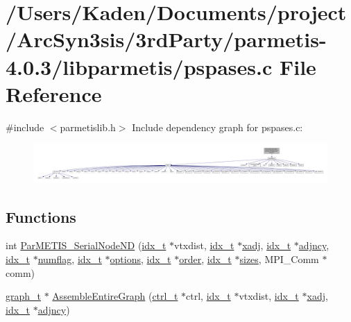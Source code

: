 \hypertarget{a00389}{}\section{/\+Users/\+Kaden/\+Documents/project/\+Arc\+Syn3sis/3rd\+Party/parmetis-\/4.0.3/libparmetis/pspases.c File Reference}
\label{a00389}
{\ttfamily \#include $<$parmetislib.\+h$>$}\newline
Include dependency graph for pspases.\+c\+:\nopagebreak
\begin{figure}[H]
\begin{center}
\leavevmode
\includegraphics[width=350pt]{a00390}
\end{center}
\end{figure}
\subsection*{Functions}
\begin{DoxyCompactItemize}
\item 
int \hyperlink{a00389_a5ea6a6f60f172d69aae0c4bace99a5ae}{Par\+M\+E\+T\+I\+S\+\_\+\+Serial\+Node\+ND} (\hyperlink{a00876_aaa5262be3e700770163401acb0150f52}{idx\+\_\+t} $\ast$vtxdist, \hyperlink{a00876_aaa5262be3e700770163401acb0150f52}{idx\+\_\+t} $\ast$\hyperlink{a00879_aa8fc7f75458e38e1e2979ed6db639164}{xadj}, \hyperlink{a00876_aaa5262be3e700770163401acb0150f52}{idx\+\_\+t} $\ast$\hyperlink{a00879_a20c068e3ebdd8f9889fb82c1f677d679}{adjncy}, \hyperlink{a00876_aaa5262be3e700770163401acb0150f52}{idx\+\_\+t} $\ast$\hyperlink{a00879_aa48ecaf34ec788199c3aedb2b1558eb7}{numflag}, \hyperlink{a00876_aaa5262be3e700770163401acb0150f52}{idx\+\_\+t} $\ast$\hyperlink{a00879_a68c032ed4161802775c6847d4cb39adf}{options}, \hyperlink{a00876_aaa5262be3e700770163401acb0150f52}{idx\+\_\+t} $\ast$\hyperlink{a00611_aab21ede0c02820806e77fd7890ee6bd7}{order}, \hyperlink{a00876_aaa5262be3e700770163401acb0150f52}{idx\+\_\+t} $\ast$\hyperlink{a00879_aa2b865ca95a167fa6c34c48e9847379c}{sizes}, M\+P\+I\+\_\+\+Comm $\ast$comm)
\item 
\hyperlink{a00734}{graph\+\_\+t} $\ast$ \hyperlink{a00389_a2bca72c51127ef49eece3ae89414b6b6}{Assemble\+Entire\+Graph} (\hyperlink{a00742}{ctrl\+\_\+t} $\ast$ctrl, \hyperlink{a00876_aaa5262be3e700770163401acb0150f52}{idx\+\_\+t} $\ast$vtxdist, \hyperlink{a00876_aaa5262be3e700770163401acb0150f52}{idx\+\_\+t} $\ast$\hyperlink{a00879_aa8fc7f75458e38e1e2979ed6db639164}{xadj}, \hyperlink{a00876_aaa5262be3e700770163401acb0150f52}{idx\+\_\+t} $\ast$\hyperlink{a00879_a20c068e3ebdd8f9889fb82c1f677d679}{adjncy})
\end{DoxyCompactItemize}


